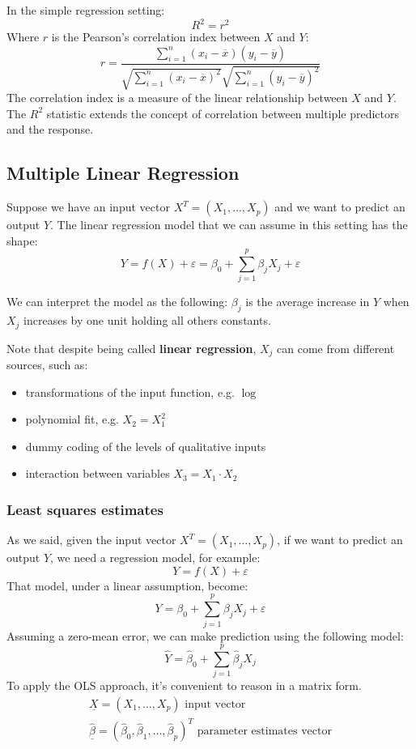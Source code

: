 In the simple regression setting:
\[
    R^2 = r^2
\]
Where $r$ is the Pearson's correlation index between $X$ and $Y$:
\[
    r = \frac{\sum_{i=1}^{n} (x_i - \overline{x})(y_i - \overline{y})}{\sqrt{\sum_{i=1}^{n} (x_i - \overline{x})^2} \sqrt{\sum_{i=1}^{n} (y_i - \overline{y})^2}}
\]
The correlation index is a measure of the linear relationship between $X$ and $Y$. The $R^2$ statistic extends the concept of correlation between multiple predictors and the response.

\subsection{Multiple Linear Regression}
Suppose we have an input vector $X^T = (X_1, \dots, X_p)$ and we want to predict an output $Y$. The linear regression model that we can assume in this setting has the shape:
\[
    Y = f(X) + \varepsilon = \beta_0 + \sum_{j=1}^{p} \beta_j X_j + \varepsilon
\]

We can interpret the model as the following: $\beta_j$ is the average increase in $Y$ when $X_j$ increases by one unit holding all others constants.

Note that despite being called \textbf{linear regression}, $X_j$ can come from different sources, such as:
\begin{itemize}
    \item transformations of the input function, e.g. $\log$
    \item polynomial fit, e.g. $X_2 = X_1^2$
    \item dummy coding of the levels of qualitative inputs
    \item interaction between variables $X_3 = X_1 \cdot X_2$
\end{itemize}


\subsubsection*{Least squares estimates}
As we said, given the input vector $X^T = (X_1, \dots, X_p)$, if we want to predict an output $Y$, we need a regression model, for example:
\[
    Y = f(X) + \varepsilon
\]
That model, under a linear assumption, become:
\[
    Y = \beta_0 + \sum_{j=1}^{p} \beta_j X_j + \varepsilon
\]
Assuming a zero-mean error, we can make prediction using the following model:
\[
    \hat{Y} = \hat{\beta}_0 + \sum_{j=1}^{p} \hat{\beta}_j X_j
\]
To apply the OLS approach, it's convenient to reason in a matrix form.
\begin{gather*}
    \underline{X} = (X_1, \dots, X_p)\text{ input vector} \\
    \underline{\hat\beta} = (\hat\beta_0, \hat\beta_1, \dots, \hat\beta_p)^T\text{ parameter estimates vector} \\
\end{gather*}

